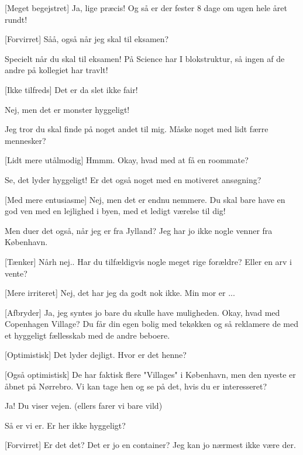 \documentclass[a4paper,11pt]{article}
\begin{document}
\begin{sketch}
[Meget begejstret] Ja, lige præcis! Og så er der fester $8$ dage om ugen hele året rundt!

[Forvirret] Såå, også når jeg skal til eksamen?

 Specielt når du skal til eksamen! På Science har I blokstruktur, så ingen af de andre på kollegiet har travlt! 

[Ikke tilfreds] Det er da slet ikke fair! 

 Nej, men det er monster hyggeligt!

 Jeg tror du skal finde på noget andet til mig. Måske noget med lidt færre mennesker?

[Lidt mere utålmodig] Hmmm. Okay, hvad med at få en roommate?

 Se, det lyder hyggeligt! Er det også noget med en motiveret ansøgning?

[Med mere entusiasme] Nej, men det er endnu nemmere. Du skal bare have en god ven med en lejlighed i byen, med et ledigt værelse til dig!  

 Men duer det også, når jeg er fra Jylland? Jeg har jo ikke nogle venner fra København. 

[Tænker] Nårh nej.. Har du tilfældigvis nogle meget rige forældre? Eller en arv i vente?

[Mere irriteret] Nej, det har jeg da godt nok ikke. Min mor er ...

[Afbryder] Ja, jeg syntes jo bare du skulle have muligheden. 
 Okay, hvad med Copenhagen Village? Du får din egen bolig med tekøkken og så reklamere de med et hyggeligt fællesskab med de andre beboere.

[Optimistisk] Det lyder dejligt. Hvor er det henne? 

[Også optimistisk] De har faktisk flere "Villages" i København, men den nyeste er åbnet på Nørrebro. Vi kan tage hen og se på det, hvis du er interesseret?

 Ja! Du viser vejen. (ellers farer vi bare vild)


 Så er vi er. Er her ikke hyggeligt? 


[Forvirret] Er det det? Det er jo en container? Jeg kan jo nærmest ikke være der. 


\end{sketch}
\end{document}
